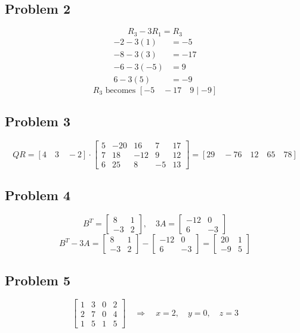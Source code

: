 \documentclass[12pt]{article}
\begin{document}
\subsection*{Problem 2}
\[
R_3 - 3R_1 = R_3
\]
\[
\begin{aligned}
-2 - 3(1) &= -5 \\
-8 - 3(3) &= -17 \\
-6 - 3(-5) &= 9 \\
6 - 3(5) &= -9
\end{aligned}
\]
\[
R_3 \text{ becomes } [-5 \quad -17 \quad 9 \mid -9]
\]

\subsection*{Problem 3}
\[
QR = [4 \quad 3 \quad -2] \cdot
\begin{bmatrix}
5 & -20 & 16 & 7 & 17 \\
7 & 18 & -12 & 9 & 12 \\
6 & 25 & 8 & -5 & 13
\end{bmatrix}
= \boxed{[29 \quad -76 \quad 12 \quad 65 \quad 78]}
\]
\subsection*{Problem 4}
\[
B^T = 
\begin{bmatrix}
8 & 1 \\
-3 & 2
\end{bmatrix}
,\quad
3A = 
\begin{bmatrix}
-12 & 0 \\
6 & -3
\end{bmatrix}
\]
\[
B^T - 3A = 
\begin{bmatrix}
8 & 1 \\
-3 & 2
\end{bmatrix}
-
\begin{bmatrix}
-12 & 0 \\
6 & -3
\end{bmatrix}
=
\begin{bmatrix}
20 & 1 \\
-9 & 5
\end{bmatrix}
\]

\subsection*{Problem 5}
\[
\left[
\begin{array}{ccc|c}
1 & 3 & 0 & 2 \\
2 & 7 & 0 & 4 \\
1 & 5 & 1 & 5
\end{array}
\right]
\quad \Rightarrow \quad
\boxed{x = 2,\quad y = 0,\quad z = 3}
\]
\end{document}
